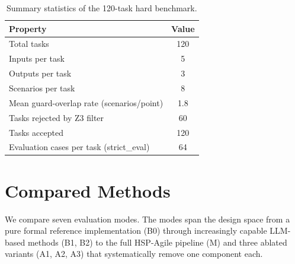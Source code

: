 \begin{table}[H]
  \caption{Summary statistics of the 120-task hard benchmark.}
  \label{tab:benchmark-stats}
  \centering
  \begin{tabular}{lc}
    \toprule
    Property & Value \\
    \midrule
    Total tasks & 120 \\
    Inputs per task & 5 \\
    Outputs per task & 3 \\
    Scenarios per task & 8 \\
    Mean guard-overlap rate (scenarios/point) & 1.8 \\
    Tasks rejected by Z3 filter & 60 \\
    Tasks accepted & 120 \\
    Evaluation cases per task (strict\_eval) & 64 \\
    \bottomrule
  \end{tabular}
\end{table}

\section{Compared Methods}
\label{sec:exp:methods}

We compare seven evaluation modes.  The modes span the design space from a pure
formal reference implementation (B0) through increasingly capable LLM-based methods
(B1, B2) to the full HSP-Agile pipeline (M) and three ablated variants (A1, A2, A3)
that systematically remove one component each.

